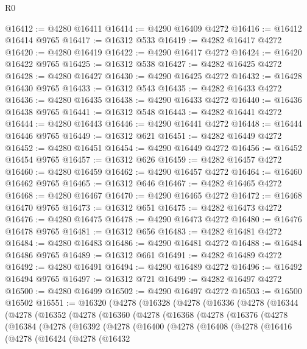 \begin{lexlean}{R0}
\begin{coremodule}
@16412 := @4280 @16411
@16414 := @4290 @16409 @4272
@16416 := @16412 @16414 @9765
@16417 := @16312 @533
@16419 := @4282 @16417 @4272
@16420 := @4280 @16419
@16422 := @4290 @16417 @4272
@16424 := @16420 @16422 @9765
@16425 := @16312 @538
@16427 := @4282 @16425 @4272
@16428 := @4280 @16427
@16430 := @4290 @16425 @4272
@16432 := @16428 @16430 @9765
@16433 := @16312 @543
@16435 := @4282 @16433 @4272
@16436 := @4280 @16435
@16438 := @4290 @16433 @4272
@16440 := @16436 @16438 @9765
@16441 := @16312 @548
@16443 := @4282 @16441 @4272
@16444 := @4280 @16443
@16446 := @4290 @16441 @4272
@16448 := @16444 @16446 @9765
@16449 := @16312 @621
@16451 := @4282 @16449 @4272
@16452 := @4280 @16451
@16454 := @4290 @16449 @4272
@16456 := @16452 @16454 @9765
@16457 := @16312 @626
@16459 := @4282 @16457 @4272
@16460 := @4280 @16459
@16462 := @4290 @16457 @4272
@16464 := @16460 @16462 @9765
@16465 := @16312 @646
@16467 := @4282 @16465 @4272
@16468 := @4280 @16467
@16470 := @4290 @16465 @4272
@16472 := @16468 @16470 @9765
@16473 := @16312 @651
@16475 := @4282 @16473 @4272
@16476 := @4280 @16475
@16478 := @4290 @16473 @4272
@16480 := @16476 @16478 @9765
@16481 := @16312 @656
@16483 := @4282 @16481 @4272
@16484 := @4280 @16483
@16486 := @4290 @16481 @4272
@16488 := @16484 @16486 @9765
@16489 := @16312 @661
@16491 := @4282 @16489 @4272
@16492 := @4280 @16491
@16494 := @4290 @16489 @4272
@16496 := @16492 @16494 @9765
@16497 := @16312 @721
@16499 := @4282 @16497 @4272
@16500 := @4280 @16499
@16502 := @4290 @16497 @4272
@16503 := @16500 @16502
@16551 := @16320
    (@4278
      (@16328
        (@4278
          (@16336
            (@4278
              (@16344
                (@4278
                  (@16352
                    (@4278
                      (@16360
                        (@4278
                          (@16368
                            (@4278
                              (@16376
                                (@4278
                                  (@16384
                                    (@4278
                                      (@16392
                                        (@4278
                                          (@16400
                                            (@4278
                                              (@16408
                                                (@4278
                                                  (@16416
                                                    (@4278
                                                      (@16424
                                                        (@4278
                                                          (@16432

\end{coremodule}
\end{lexlean}
